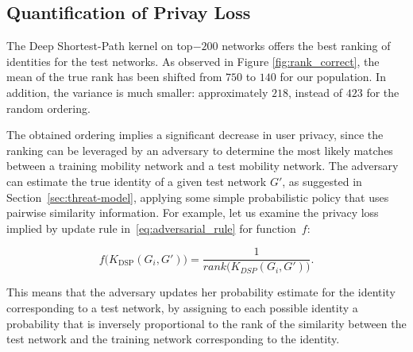 \subsection{Quantification of Privay Loss}



The Deep Shortest-Path kernel on top$-200$ networks offers the best ranking of identities for the test networks.
As observed in Figure \ref{fig:rank_correct}, the mean of the true rank has been shifted from $ 750 $ to $ 140 $ for our population.
In addition, the variance is much smaller: approximately $ 218 $, instead of $ 423 $ for the random ordering.




The obtained ordering implies a significant decrease in user privacy, since the ranking can be leveraged by an adversary to determine the most likely matches between a training mobility network and a test mobility network.
The adversary can estimate the true identity of a given test network $ G' $, as suggested in Section~\ref{sec:threat-model}, applying some simple probabilistic policy that uses pairwise similarity information. For example, let us examine the privacy loss implied by update rule in~\eqref{eq:adversarial_rule} for  \mbox{function $ f$}:

\begin{equation}
f\big(K_{\text{DSP}}(G_i, G')\big) =\frac{1}{rank\big(K_{DSP}(G_i, G')\big)}.
\label{eq:inverse_rank}
\end{equation}


This means that the adversary updates her probability estimate for the identity corresponding to a test network, by assigning to each possible identity a probability that is inversely proportional to the rank of the similarity between the test network and the training network corresponding to the identity.

